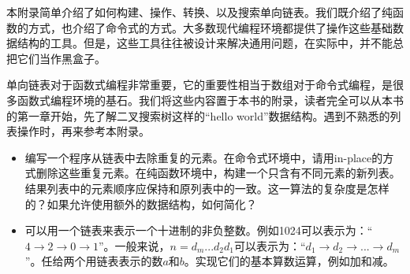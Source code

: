 \documentclass[UTF8]{article}
\begin{document}
本附录简单介绍了如何构建、操作、转换、以及搜索单向链表。我们既介绍了纯函数的方式，也介绍了命令式的方式。大多数现代编程环境都提供了操作这些基础数据结构的工具。但是，这些工具往往被设计来解决通用问题，在实际中，并不能总把它们当作黑盒子。

单向链表对于函数式编程非常重要，它的重要性相当于数组对于命令式编程，是很多函数式编程环境的基石。我们将这些内容置于本书的附录，读者完全可以从本书的第一章开始，先了解二叉搜索树这样的“hello world”数据结构。遇到不熟悉的列表操作时，再来参考本附录。

\begin{Exercise}
\begin{itemize}
\item 编写一个程序从链表中去除重复的元素。在命令式环境中，请用in-place的方式删除这些重复元素。在纯函数环境中，构建一个只含有不同元素的新列表。结果列表中的元素顺序应保持和原列表中的一致。这一算法的复杂度是怎样的？如果允许使用额外的数据结构，如何简化？
\item 可以用一个链表来表示一个十进制的非负整数。例如1024可以表示为：“$4 \rightarrow 2 \rightarrow 0 \rightarrow 1$”。一般来说，$n = d_m...d_2d_1$可以表示为：“$d_1 \rightarrow d_2 \rightarrow ... \rightarrow d_m$”。任给两个用链表表示的数$a$和$b$。实现它们的基本算数运算，例如加和减。
\end{itemize}
\end{Exercise}

\end{document}
